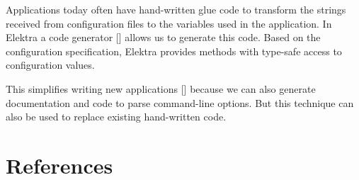 Applications today often have hand-\/written glue code to transform the strings received from configuration files to the variables used in the application. In Elektra a code generator \mbox{[}\mbox{]} allows us to generate this code. Based on the configuration specification, Elektra provides methods with type-\/safe access to configuration values.

This simplifies writing new applications \mbox{[}\mbox{]} because we can also generate documentation and code to parse command-\/line options. But this technique can also be used to replace existing hand-\/written code.

\section*{References}